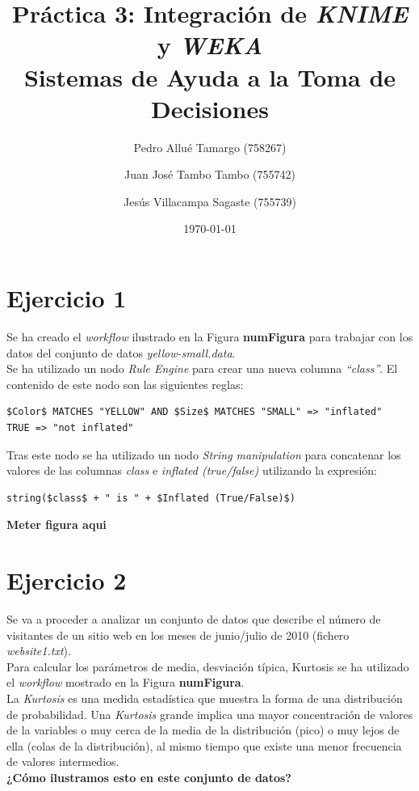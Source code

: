 \documentclass[10pt,a4paper]{article}
\begin{document}
\begin{titlepage}
\title{\textbf{
	{\Huge Práctica 3: Integración de \emph{KNIME} y \emph{WEKA}}\\
	{\Large Sistemas de Ayuda a la Toma de Decisiones}
}}
\author{
	Pedro Allué Tamargo (758267)
	\and
	Juan José Tambo Tambo (755742)
	\and
	Jesús Villacampa Sagaste (755739)
}
\date{\today}
\clearpage\maketitle
\thispagestyle{empty}
\end{titlepage}

\tableofcontents

\newpage
\section{Ejercicio 1}

Se ha creado el \emph{workflow} ilustrado en la Figura \textbf{numFigura} para trabajar con los datos del conjunto de datos \emph{yellow-small.data}.\\
Se ha utilizado un nodo \emph{Rule Engine} para crear una nueva columna \emph{``class''}. El contenido de este nodo son las siguientes reglas:

\begin{lstlisting}
$Color$ MATCHES "YELLOW" AND $Size$ MATCHES "SMALL" => "inflated"
TRUE => "not inflated"
\end{lstlisting}

Tras este nodo se ha utilizado un nodo \emph{String manipulation} para concatenar los valores de las columnas \emph{class} e \emph{inflated (true/false)} utilizando la expresión:

\begin{lstlisting}
string($class$ + " is " + $Inflated (True/False)$)
\end{lstlisting}

{\Huge \textbf{Meter figura aqui}}

\section{Ejercicio 2}

Se va a proceder a analizar un conjunto de datos que describe el número de visitantes de un sitio web en los meses de junio/julio de 2010 (fichero \emph{website1.txt}).\\

Para calcular los parámetros de media, desviación típica, Kurtosis se ha utilizado el \emph{workflow} mostrado en la Figura \textbf{numFigura}.\\
La \emph{Kurtosis} es una medida estadística que muestra la forma de una distribución de probabilidad. Una \emph{Kurtosis} grande implica una mayor concentración de valores de la variables o muy cerca de la media de la distribución (pico) o muy lejos de ella (colas de la distribución), al mismo tiempo que existe una menor frecuencia de valores intermedios.\\
\textbf{¿Cómo ilustramos esto en este conjunto de datos?}\\
\end{document}
